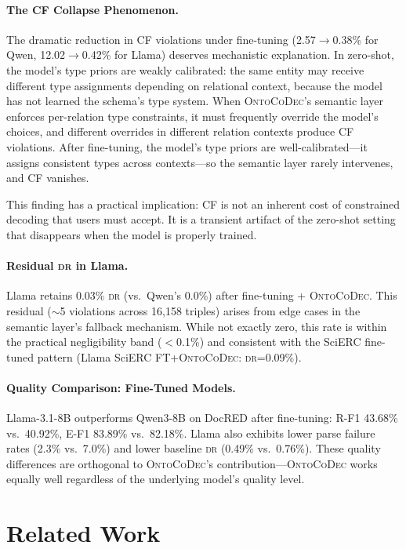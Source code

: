 \documentclass[11pt,a4paper]{article}
\newcommand{\sys}{\textsc{OntoCoDec}}
\newcommand{\DR}{\textsc{dr}}
\begin{document}
\paragraph{The CF Collapse Phenomenon.}
The dramatic reduction in CF violations under fine-tuning (2.57$\to$0.38\% for Qwen, 12.02$\to$0.42\% for Llama) deserves mechanistic explanation. In zero-shot, the model's type priors are weakly calibrated: the same entity may receive different type assignments depending on relational context, because the model has not learned the schema's type system. When \sys{}'s semantic layer enforces per-relation type constraints, it must frequently override the model's choices, and different overrides in different relation contexts produce CF violations. After fine-tuning, the model's type priors are well-calibrated---it assigns consistent types across contexts---so the semantic layer rarely intervenes, and CF vanishes.

This finding has a practical implication: CF is not an inherent cost of constrained decoding that users must accept. It is a transient artifact of the zero-shot setting that disappears when the model is properly trained.

\paragraph{Residual \DR{} in Llama.}
Llama retains 0.03\% \DR{} (vs.\ Qwen's 0.0\%) after fine-tuning + \sys{}. This residual ($\sim$5 violations across 16,158 triples) arises from edge cases in the semantic layer's fallback mechanism. While not exactly zero, this rate is within the practical negligibility band ($<$0.1\%) and consistent with the SciERC fine-tuned pattern (Llama SciERC FT+\sys{}: \DR{}=0.09\%).

\paragraph{Quality Comparison: Fine-Tuned Models.}
Llama-3.1-8B outperforms Qwen3-8B on DocRED after fine-tuning: R-F1 43.68\% vs.\ 40.92\%, E-F1 83.89\% vs.\ 82.18\%. Llama also exhibits lower parse failure rates (2.3\% vs.\ 7.0\%) and lower baseline \DR{} (0.49\% vs.\ 0.76\%). These quality differences are orthogonal to \sys{}'s contribution---\sys{} works equally well regardless of the underlying model's quality level.

\section{Related Work}
\label{sec:related}
\end{document}
